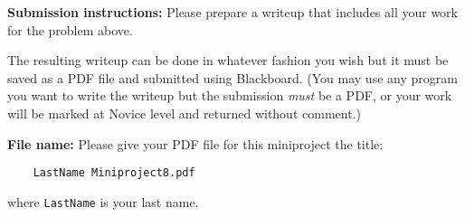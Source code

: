 \documentclass[11pt,letterpaper]{article}
\begin{document}
\hrulefill

\noindent
\textbf{Submission instructions:} Please prepare a writeup that includes all your work for the problem above. 

The resulting writeup can be done in whatever fashion you wish but it must be saved as a PDF file and submitted using Blackboard. (You may use any program you want to write the writeup but the submission \emph{must} be a PDF, or your work will be marked at Novice level and returned without comment.) 

\noindent
\textbf{File name:} Please give your PDF file for this miniproject the title: 
\begin{verbatim}
	LastName Miniproject8.pdf
\end{verbatim}
where \texttt{LastName} is your last name. 
\end{document}

